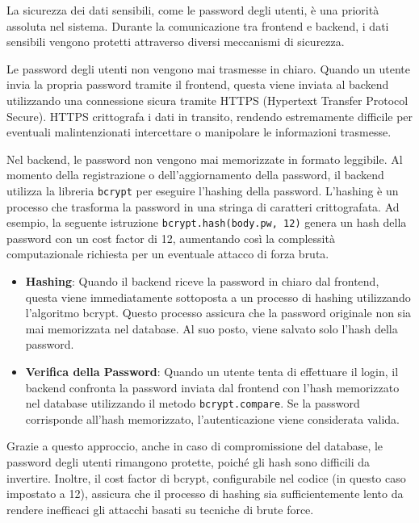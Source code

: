 \documentclass[twoside]{supsistudent}
\begin{document}
La sicurezza dei dati sensibili, come le password degli utenti, è una priorità assoluta nel sistema. Durante la comunicazione tra frontend e backend, i dati sensibili vengono protetti attraverso diversi meccanismi di sicurezza.

Le password degli utenti non vengono mai trasmesse in chiaro. Quando un utente invia la propria password tramite il frontend, questa viene inviata al backend utilizzando una connessione sicura tramite HTTPS (Hypertext Transfer Protocol Secure). HTTPS crittografa i dati in transito, rendendo estremamente difficile per eventuali malintenzionati intercettare o manipolare le informazioni trasmesse.

Nel backend, le password non vengono mai memorizzate in formato leggibile. Al momento della registrazione o dell'aggiornamento della password, il backend utilizza la libreria \texttt{bcrypt} per eseguire l'hashing della password. L'hashing è un processo che trasforma la password in una stringa di caratteri crittografata. Ad esempio, la seguente istruzione \texttt{bcrypt.hash(body.pw, 12)} genera un hash della password con un cost factor di 12, aumentando così la complessità computazionale richiesta per un eventuale attacco di forza bruta.

\begin{itemize}
  \item \textbf{Hashing}: Quando il backend riceve la password in chiaro dal frontend, questa viene immediatamente sottoposta a un processo di hashing utilizzando l'algoritmo bcrypt. Questo processo assicura che la password originale non sia mai memorizzata nel database. Al suo posto, viene salvato solo l'hash della password.

  \item \textbf{Verifica della Password}: Quando un utente tenta di effettuare il login, il backend confronta la password inviata dal frontend con l'hash memorizzato nel database utilizzando il metodo \texttt{bcrypt.compare}. Se la password corrisponde all'hash memorizzato, l'autenticazione viene considerata valida.
\end{itemize}

Grazie a questo approccio, anche in caso di compromissione del database, le password degli utenti rimangono protette, poiché gli hash sono difficili da invertire. Inoltre, il cost factor di bcrypt, configurabile nel codice (in questo caso impostato a 12), assicura che il processo di hashing sia sufficientemente lento da rendere inefficaci gli attacchi basati su tecniche di brute force.
\end{document}
